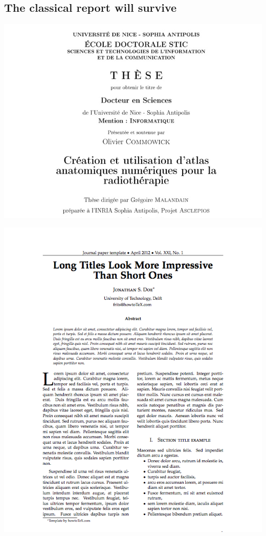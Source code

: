 \documentclass[%
twoside,                 %
draft,                   %
final,                   %
chapterprefix=true,      %
open=right               %
10pt]{book}
\begin{document}
\begin{shadedquoteBlue}
\section*{The classical report will survive}


\begin{center}  %
  \centerline{\includegraphics[width=1.2\linewidth]{fig/latex_thesis.jpg}}
\end{center}



\begin{center}  %
  \centerline{\includegraphics[width=1.2\linewidth]{fig/latex_paper1.png}}
\end{center}


\end{shadedquoteBlue}
\end{document}

